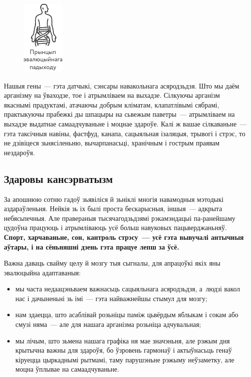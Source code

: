 \begin{figure}[htb!]
  \centering
  \includegraphics[scale=1.5]{willpower/ch3/11.pdf}
\end{figure}

Нашыя гены~--- гэта датчыкі, сэнсары навакольнага асяродзьдзя. Што мы даём арганізму на ўваходзе, тое і атрымліваем на выхадзе. Сілкуючы арганізм якаснымі прадуктамі, атачаючы добрым кліматам, клапатлівымі сябрамі, практыкуючы прабежкі ды шпацыры на сьвежым паветры~--- атрымліваем на выхадзе выдатнае самаадчуваньне і моцнае здароўе. Калі ж вашае сілкаваньне~--- гэта таксічныя навіны, фастфуд, канапа, сацыяльная ізаляцыя, трывогі і стрэс, то не дзівіцеся зьнясіленьню, вычарпанасьці, хранічным і гострым праявам нездароўя.

\subsection*{Здаровы кансэрватызм}

За апошнюю сотню гадоў зьявіліся й зьніклі многія навамодныя мэтодыкі аздараўленьня. Нейкія зь іх былі проста бескарысныя, іншыя~--- адкрыта небясьпечныя. Але правераныя тысячагодзьдзямі рэкамэндацыі па-ранейшаму цудоўна працуюць і атрымліваюць усё больш навуковых пацьверджаньняў. \textbf{Спорт, харчаваньне, сон, кантроль стрэсу~--- усё гэта вывучалі антычныя аўтары, і на сёньняшні дзень гэта працуе лепш за ўсё.}

Важна даваць свайму целу й мозгу тыя сыгналы, для апрацоўкі якіх яны эвалюцыйна адаптаваныя: 
\begin{itemize}
  \item мы часта недаацэньваем важнасьць сацыяльнага асяродзьдзя, а~людзі вакол нас і дачыненьні зь імі~--- гэта найважнейшы стымул для мозгу;
  \item нам здаецца, што асаблівай розьніцы паміж цьвёрдым яблыкам і сокам або смузі няма~--- але для нашага арганізма розьніца адчувальная;
  \item мы лічым, што зьмена нашага графіка ня мае значэньня, але рэжым дня крытычна важны для здароўя, бо ўзровень гармонаў і актыўнасьць генаў кіруецца цыркаднымі рытмамі, таму парушэньне рэжыму неўзаметку, але моцна ўплывае на самаадчуваньне.
\end{itemize}

